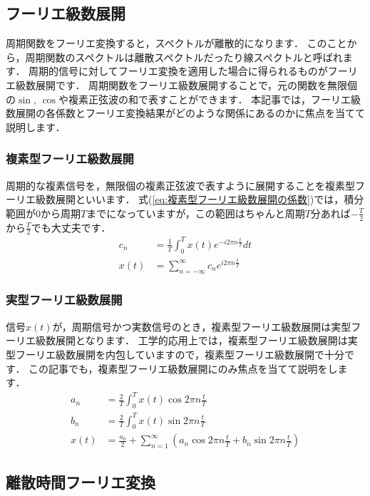 \subsection{フーリエ級数展開}

周期関数をフーリエ変換すると，スペクトルが離散的になります．
このことから，周期関数のスペクトルは離散スペクトルだったり線スペクトルと呼ばれます．
周期的信号に対してフーリエ変換を適用した場合に得られるものがフーリエ級数展開です．
周期関数をフーリエ級数展開することで，元の関数を無限個の$\sin$, $\cos$や複素正弦波の和で表すことができます．
本記事では，フーリエ級数展開の各係数とフーリエ変換結果がどのような関係にあるのかに焦点を当てて説明します．

\subsubsection{複素型フーリエ級数展開}

周期的な複素信号を，無限個の複素正弦波で表すように展開することを複素型フーリエ級数展開といいます．
式(\ref{eq:複素型フーリエ級数展開の係数})では，積分範囲が$0$から周期$T$までになっていますが，この範囲はちゃんと周期$T$分あれば$-\frac{T}{2}$から$\frac{T}{2}$でも大丈夫です．
\begin{align}
c_n &= \frac{1}{T} \int_{0}^{T} x(t) e^{-i2\pi n \frac{t}{T}} dt \label{eq:複素型フーリエ級数展開の係数}\\
x(t) &= \sum_{n=-\infty}^{\infty} c_n e^{i2\pi n \frac{t}{T}}
\end{align}


\subsubsection{実型フーリエ級数展開}

信号$x(t)$が，周期信号かつ実数信号のとき，複素型フーリエ級数展開は実型フーリエ級数展開となります．
工学的応用上では，複素型フーリエ級数展開は実型フーリエ級数展開を内包していますので，複素型フーリエ級数展開で十分です．
この記事でも，複素型フーリエ級数展開にのみ焦点を当てて説明をします．
\begin{align}
a_n &= \frac{2}{T} \int_0^T x(t) \cos {2\pi n \frac{t}{T}} \\
b_n &= \frac{2}{T} \int_0^T x(t) \sin {2\pi n \frac{t}{T}} \\
x(t) &= \frac{a_0}{2} + \sum_{n=1}^{\infty}\left(a_n \cos {2\pi n \frac{t}{T}} + b_n \sin {2\pi n \frac{t}{T}} \right)
\end{align}


\subsection{離散時間フーリエ変換}

